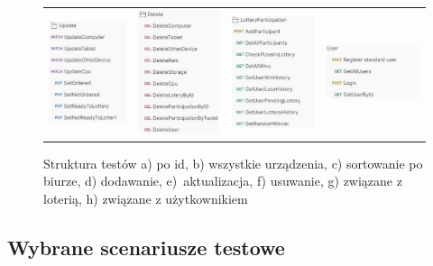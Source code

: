 \begin{figure}[htb]
\begin{tabular}{@{}llll@{}}
	\includegraphics[width=0.21\linewidth]{rys06/struct/update.pdf} & 
	\includegraphics[width=0.21\linewidth]{rys06/struct/del.pdf} & 
	\includegraphics[width=0.21\linewidth]{rys06/struct/lottery.pdf} & 
	\includegraphics[width=0.21\linewidth]{rys06/struct/user.pdf} \\
 
 
	\end{tabular}
  \caption{Struktura testów a) po id, b) wszystkie urządzenia, c) sortowanie po biurze, d) dodawanie, e)~aktualizacja, f) usuwanie, g) związane z loterią, h) związane z użytkownikiem}
  \label{postmanStruct:label}
\end{figure}
\newpage

\subsection {Wybrane scenariusze testowe}


